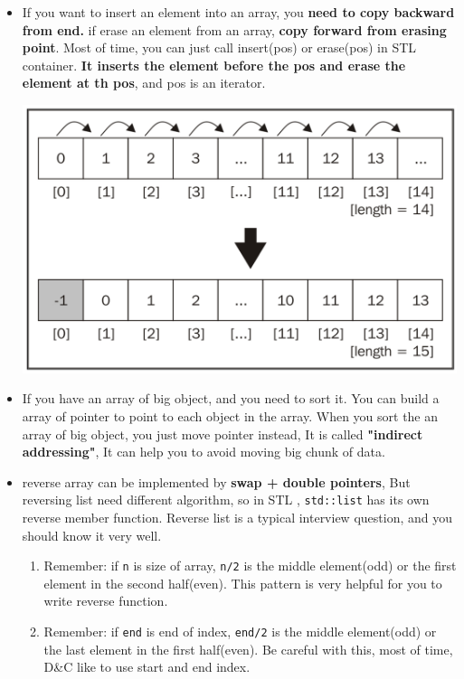 \documentclass[a4paper,11pt,twoside]{book}
\begin{document}
\begin{itemize}
	\item If you want to insert an element into an array, you  \textbf{need to copy backward from end. }
if erase an element from an array, \textbf{copy forward from erasing point}. Most of time, you can just call insert(pos) or erase(pos) in STL container. \textbf{It inserts the element before the pos and erase the element at th pos}, and pos is an iterator.  

\includegraphics[scale=0.35]{pics/array_insert.png} \newline

	\item If you have an array of big object, and you need to sort it. You can build a array of pointer to point to each object in the array. When you sort the an array of big object,  you just move pointer instead, It is called \textbf{"indirect addressing"}, It can help you to avoid moving big chunk of data.  

	\item reverse array can be implemented by \textbf{swap + double pointers}, But reversing list need different algorithm, so in STL , \texttt{std::list} has its own reverse member function. Reverse list is a typical interview question, and you should know it very well. 
	
	\begin{enumerate}
		\item Remember: if \texttt{n} is size of array, \texttt{n/2} is the middle element(odd) or the first element in the second half(even). This pattern is very helpful for you to write reverse function. 
		
		\item Remember: if \texttt{end} is end of index, \texttt{end/2} is the middle element(odd) or the last element in the first half(even). Be careful with this, most of time, D\&C like to use start and end index. 
		

\end{enumerate}
\end{itemize}
\end{document}
